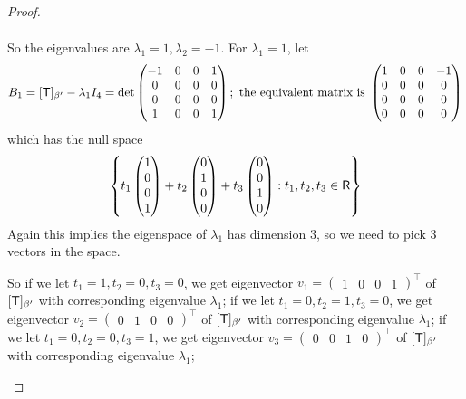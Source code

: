 \begin{proof}
\begin{enumerate}
\begin{align*}
\end{align*}
So the eigenvalues are \(\lambda_1 = 1, \lambda_2 = -1\).
For \(\lambda_1 = 1\), let
\[
    B_1 = [\textsf{T}]_{\beta'} - \lambda_1 I_4
    = \det \begin{pmatrix}
        -1 & 0 & 0 & 1 \\
        0 & 0 & 0 & 0 \\
        0 & 0 & 0 & 0 \\
        1 & 0 & 0 & 1
    \end{pmatrix}; \text{ the equivalent matrix is }
    \begin{pmatrix}
        1 & 0 & 0 & -1 \\
        0 & 0 & 0 & 0 \\
        0 & 0 & 0 & 0 \\
        0 & 0 & 0 & 0
    \end{pmatrix}
\]
which has the null space
\[
    \left\{ t_1 \begin{pmatrix} 1 \\ 0 \\ 0 \\ 1 \end{pmatrix} + t_2 \begin{pmatrix} 0 \\ 1 \\ 0 \\ 0 \end{pmatrix} + t_3 \begin{pmatrix} 0 \\ 0 \\ 1 \\ 0 \end{pmatrix} : t_1, t_2, t_3 \in \textsf{R} \right\}
\]
Again this implies the eigenspace of \(\lambda_1\) has dimension \(3\), so we need to pick \(3\) \LID{} vectors in the space.

So if we let \(t_1 = 1, t_2 = 0, t_3 = 0\), we get eigenvector \(v_1 = \begin{pmatrix} 1 & 0 & 0 & 1 \end{pmatrix}^\top\) of \([\textsf{T}]_{\beta'}\) with corresponding eigenvalue \(\lambda_1\);
if we let \(t_1 = 0, t_2 = 1, t_3 = 0\), we get eigenvector \(v_2 = \begin{pmatrix} 0 & 1 & 0 & 0 \end{pmatrix}^\top\) of \([\textsf{T}]_{\beta'}\) with corresponding eigenvalue \(\lambda_1\);
if we let \(t_1 = 0, t_2 = 0, t_3 = 1\), we get eigenvector \(v_3 = \begin{pmatrix} 0 & 0 & 1 & 0 \end{pmatrix}^\top\) of \([\textsf{T}]_{\beta'}\) with corresponding eigenvalue \(\lambda_1\);


\end{enumerate}
\end{proof}

